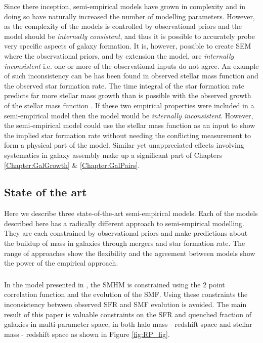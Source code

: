 Since there inception, semi-empirical models have grown in complexity and in doing so have naturally increased the number of modelling parameters. However, as the complexity of the models is controlled by observational priors and the model should be \textit{internally consistent}, and thus it is possible to accurately probe very specific aspects of galaxy formation. It is, however, possible to create SEM where the observational priors, and by extension the model, are \textit{internally inconsistent} i.e. one or more of the observational inputs do not agree. An example of such inconsistency can be has been found in observed stellar mass function and the observed star formation rate. The time integral of the star formation rate predicts far more stellar mass growth than is possible with the observed growth of the stellar mass function \citep{Leja2015ReconcilingFunction,Lapi2017StellarEquation}. If these two empirical properties were included in a semi-empirical model then the model would be \textit{internally inconsistent}. However, the semi-empirical model could use the stellar mass function as an input to show the implied star formation rate without needing the conflicting measurement to form a physical part of the model. Similar yet unappreciated effects involving systematics in galaxy assembly make up a significant part of Chapters \ref{Chapter:GalGrowth} \& \ref{Chapter:GalPairs}.

\subsection{State of the art}
Here we describe three state-of-the-art semi-empirical models. Each of the models described here has a radically different approach to semi-empirical modelling. They are each constrained by observational priors and make predictions about the buildup of mass in galaxies through mergers and star formation rate. The range of approaches show the flexibility and the agreement between models show the power of the empirical approach. 


\subsubsection{\citet{Rodriguez-Puebla2017ConstrainingProperties}}
In the model presented in \citet{Rodriguez-Puebla2017ConstrainingProperties}, the SMHM is constrained using the 2 point correlation function and the evolution of the SMF. Using these constraints the inconsistency between observed SFR and SMF evolution is avoided. The main result of this paper is valuable constraints on the SFR and quenched fraction of galaxies in multi-parameter space, in both halo mass - redshift space and stellar mass - redshift space as shown in Figure \ref{fig:RP_fig}.

